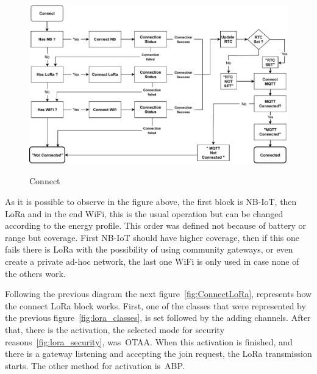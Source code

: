 \begin{figure}[htbp]
  \centering
  
    {\includegraphics[width=\linewidth]{Chapters/Figures/Connect.pdf}}%
 
  \caption{Connect}
  \label{fig:Connect}
\end{figure}

As it is possible to observe in the figure above, the first block is NB-IoT, then LoRa and in the end WiFi, this is the usual operation but can be changed according to the energy profile. This order was defined not because of battery or range but coverage. First NB-IoT should have higher coverage, then if this one fails there is  LoRa with the possibility of using community gateways, or even create a private ad-hoc network, the last one WiFi is only used in case none of the others work.



Following the previous diagram the next figure~\ref{fig:ConnectLoRa}, represents how the connect LoRa block works. First, one of the classes that were represented by the previous figure~\ref{fig:lora_classes}, is set followed by the adding channels. After that, there is the activation, the selected mode for security reasons~\ref{fig:lora_security}, was~\gls{OTAA}. When this activation is finished, and there is a gateway listening and accepting the join request, the LoRa transmission starts. The other method for activation is~\gls{ABP}.


